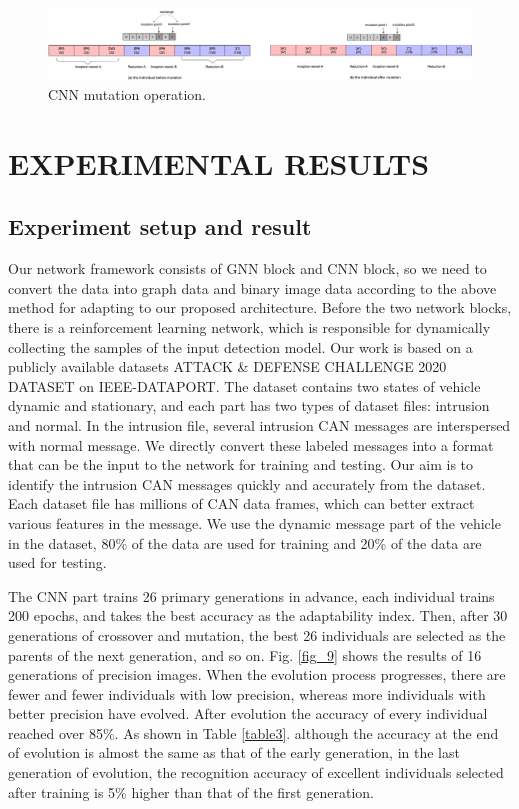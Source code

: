 \documentclass[lettersize,journal]{IEEEtran}
\begin{document}
\begin{figure}[!t]
\centering
\includegraphics[width=7in]{cnn-mutation}
\caption{CNN mutation operation.}
\label{fig_8}
\end{figure}

\section{EXPERIMENTAL RESULTS}\label{section_result}
\subsection{Experiment setup and result}
Our network framework consists of GNN block and CNN block, so we need to convert the data into graph data and binary image data according to the above method for adapting to our proposed architecture. Before the two network blocks, there is a reinforcement learning network, which is responsible for dynamically collecting the samples of the input detection model. Our work is based on a publicly available datasets ATTACK \& DEFENSE CHALLENGE 2020 DATASET \cite{74} on IEEE-DATAPORT. The dataset contains two states of vehicle dynamic and stationary, and each part has two types of dataset files: intrusion and normal. In the intrusion file, several intrusion CAN messages are interspersed with normal message. We directly convert these labeled messages into a format that can be the input to the network for training and testing. Our aim is to identify the intrusion CAN messages quickly and accurately from the dataset. Each dataset file has millions of CAN data frames, which can better extract various features in the message. We use the dynamic message part of the vehicle in the dataset, 80\% of the data are used for training and 20\% of the data are used for testing.

The CNN part trains 26 primary generations in advance, each individual trains 200 epochs, and takes the best accuracy as the adaptability index. Then, after 30 generations of crossover and mutation, the best 26 individuals are selected as the parents of the next generation, and so on. Fig. \ref{fig_9} shows the results of 16 generations of precision images. When the evolution process progresses, there are fewer and fewer individuals with low precision, whereas more individuals with better precision have evolved. After evolution the accuracy of every individual reached over 85\%. As shown in Table \ref{table3}. although the accuracy at the end of evolution is almost the same as that of the early generation, in the last generation of evolution, the recognition accuracy of excellent individuals selected after training is 5\% higher than that of the first generation.
\end{document}
